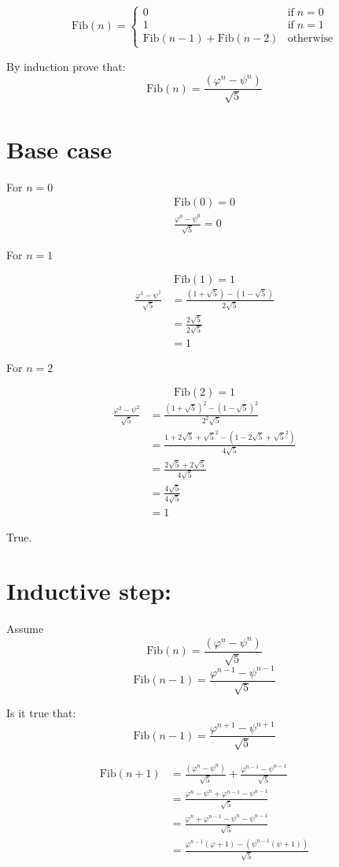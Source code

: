 \documentclass{article}
\newcommand{\Fib}[1][]{\ensuremath{\text{Fib}(#1)}}
\newcommand{\tif}{\ensuremath{\text{if} \;}}
\newcommand{\s}{\sqrt{5}}
\begin{document}
\[
	\Fib[n] = \begin{cases}
		0                         & \tif n = 0 \\
		1                         & \tif n = 1 \\
		\Fib[n - 1] + \Fib[n - 2] & \text{otherwise} 
	\end{cases}
\]

By induction prove that:
\[
	\Fib[n] = \frac{(\varphi^n - \psi^n)}{\s}
\]

\section{Base case}

For $n = 0$
\[
	\begin{aligned}
   	\Fib[0] = 0 \\
		\frac{\varphi^0 - \psi^0}{\s} = 0
	\end{aligned}
\]

For $n = 1$

\[
	\Fib[1] = 1 
\]
\[
	\begin{aligned}
		\frac{\varphi^1 - \psi^1}{\s}  &= \frac{(1 + \s) - (1 - \s)}{2\s}  \\
		& = \frac{2 \s}{2 \s} \\
		& = 1 
	\end{aligned}
\]

For $n = 2$

\[
	\Fib[2] = 1 
\]
\[
	\begin{aligned}
		\frac{\varphi^2 - \psi^2}{\s}  &= \frac{(1 + \s)^2 - (1 - \s)^2}{2^2\s}  \\
		& = \frac{1 + 2\s + \s^2 - (1 - 2\s + \s^2)}{4 \s} \\
		& = \frac{2\s + 2\s}{4 \s} \\
		& = \frac{4\s}{4 \s} \\
		& = 1 
	\end{aligned}
\]

True. 

\section{Inductive step:}

Assume 
\[
	\Fib[n] = \frac{(\varphi^n - \psi^n)}{\s}
\]
\[
	\Fib[n - 1] = \frac{\varphi^{n - 1} - \psi^{n - 1}}{\s}
\]

Is it true that:
\[
	\Fib[n - 1] = \frac{\varphi^{n + 1} - \psi^{n + 1}}{\s}
\]

\[
	\begin{aligned}
	  \Fib[n + 1] & = \frac{(\varphi^n - \psi^n)}{\s} + \frac{\varphi^{n - 1} - \psi^{n - 1}}{\s} \\
	  &= \frac{\varphi^n - \psi^n + \varphi^{n - 1} - \psi^{n - 1}}{\s} \\
	  &= \frac{\varphi^n + \varphi^{n - 1} - \psi^n - \psi^{n - 1}}{\s} \\
	  &= \frac{\varphi^{n-1} (\varphi + 1) - (\psi^{n -1} (\psi + 1))}{\s}
   \end{aligned}
\]
\end{document}
